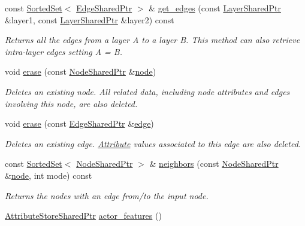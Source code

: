 \begin{DoxyCompactItemize}
const \hyperlink{classmlnet_1_1_sorted_set}{Sorted\+Set}$<$ \hyperlink{namespacemlnet_a33e88c3df9bea691a269d5e5d8bea57d}{Edge\+Shared\+Ptr} $>$ \& \hyperlink{classmlnet_1_1_m_l_network_a0e74f242ffc76837a3789f2e3e7a47be}{get\+\_\+edges} (const \hyperlink{namespacemlnet_a10c007fb811c55339dd5b9d32bb0505d}{Layer\+Shared\+Ptr} \&layer1, const \hyperlink{namespacemlnet_a10c007fb811c55339dd5b9d32bb0505d}{Layer\+Shared\+Ptr} \&layer2) const 
\begin{DoxyCompactList}\small\item\em Returns all the edges from a layer A to a layer B. This method can also retrieve intra-\/layer edges setting A = B. \end{DoxyCompactList}\item 
void \hyperlink{classmlnet_1_1_m_l_network_a071867d31c8c24a5f209af1c3b84aeeb}{erase} (const \hyperlink{namespacemlnet_acf8b1b6deb52e7dacfc676c689f9a10c}{Node\+Shared\+Ptr} \&\hyperlink{classmlnet_1_1node}{node})
\begin{DoxyCompactList}\small\item\em Deletes an existing node. All related data, including node attributes and edges involving this node, are also deleted. \end{DoxyCompactList}\item 
void \hyperlink{classmlnet_1_1_m_l_network_a4767b97853e3a9e248e2cedeaa64e3d0}{erase} (const \hyperlink{namespacemlnet_a33e88c3df9bea691a269d5e5d8bea57d}{Edge\+Shared\+Ptr} \&\hyperlink{classmlnet_1_1edge}{edge})
\begin{DoxyCompactList}\small\item\em Deletes an existing edge. \hyperlink{classmlnet_1_1_attribute}{Attribute} values associated to this edge are also deleted. \end{DoxyCompactList}\item 
const \hyperlink{classmlnet_1_1_sorted_set}{Sorted\+Set}$<$ \hyperlink{namespacemlnet_acf8b1b6deb52e7dacfc676c689f9a10c}{Node\+Shared\+Ptr} $>$ \& \hyperlink{classmlnet_1_1_m_l_network_aa81b9028f4f183857ac8c7939cb4fc39}{neighbors} (const \hyperlink{namespacemlnet_acf8b1b6deb52e7dacfc676c689f9a10c}{Node\+Shared\+Ptr} \&\hyperlink{classmlnet_1_1node}{node}, int mode) const 
\begin{DoxyCompactList}\small\item\em Returns the nodes with an edge from/to the input node. \end{DoxyCompactList}\item 
\hyperlink{namespacemlnet_a3d60b9ef6ef6489d000f6061e0a1bdf2}{Attribute\+Store\+Shared\+Ptr} \hyperlink{classmlnet_1_1_m_l_network_a4367cd80f2528c72acbaaed91de62b8b}{actor\+\_\+features} ()

\end{DoxyCompactItemize}

